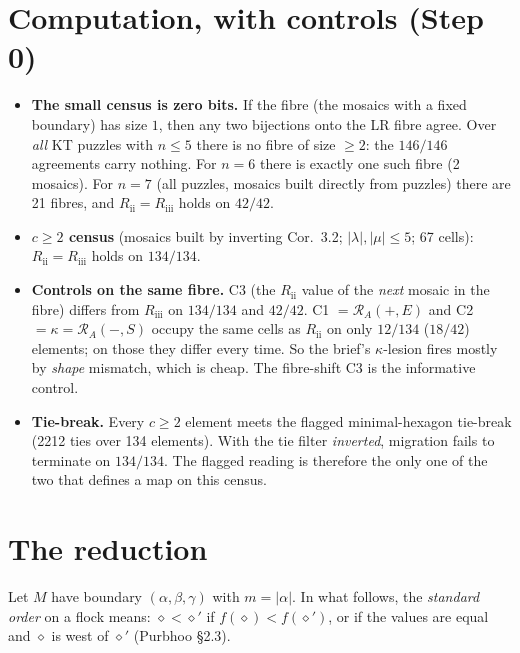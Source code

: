 \documentclass[11pt]{article}
\theoremstyle{definition}
\newcommand{\Rii}{R_{\mathrm{ii}}}
\newcommand{\Riii}{R_{\mathrm{iii}}}
\begin{document}
\section{Computation, with controls (Step 0)}
\begin{itemize}
\item \textbf{The small census is zero bits.} If the fibre (the mosaics with a fixed boundary) has size $1$, then any two bijections
onto the LR fibre agree. Over \emph{all} KT puzzles with $n\le5$ there is no fibre of size $\ge2$: the $146/146$ agreements carry
nothing. For $n=6$ there is exactly one such fibre (2 mosaics). For $n=7$ (all puzzles, mosaics built directly from puzzles) there
are 21 fibres, and $\Rii=\Riii$ holds on $42/42$.
\item \textbf{$c\ge2$ census} (mosaics built by inverting Cor.~3.2; $|\lambda|,|\mu|\le5$; 67 cells): $\Rii=\Riii$ holds on
$134/134$.
\item \textbf{Controls on the same fibre.} C3 (the $\Rii$ value of the \emph{next} mosaic in the fibre) differs from $\Riii$ on
$134/134$ and $42/42$. C1 $=\mathcal R_A(+,E)$ and C2 $=\kappa=\mathcal R_A(-,S)$ occupy the same cells as $\Rii$ on only
$12/134$ ($18/42$) elements; on those they differ every time. So the brief's $\kappa$-lesion fires mostly by \emph{shape}
mismatch, which is cheap. The fibre-shift C3 is the informative control.
\item \textbf{Tie-break.} Every $c\ge2$ element meets the flagged minimal-hexagon tie-break (2212 ties over 134 elements). With the
tie filter \emph{inverted}, migration fails to terminate on $134/134$. The flagged reading is therefore the only one of the two
that defines a map on this census.
\end{itemize}

\section{The reduction}
Let $M$ have boundary $(\alpha,\beta,\gamma)$ with $m=|\alpha|$. In what follows, the \emph{standard order} on a flock means:
$\diamond<\diamond'$ if $f(\diamond)<f(\diamond')$, or if the values are equal and $\diamond$ is west of $\diamond'$ (Purbhoo
\S2.3).
\end{document}
